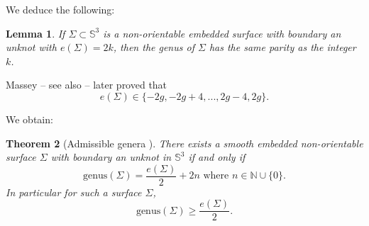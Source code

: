 \documentclass[10pt,a4paper]{amsart}
\newtheorem{thm}{Theorem}[section]
\newtheorem{lemma}[thm]{Lemma}
\numberwithin{equation}{section}
\begin{document}
We deduce the following:

\begin{lemma}\label{parity}
If $\Sigma\subset \mathbb{S}^3$ is a non-orientable embedded surface with boundary an unknot with $e(\Sigma)=2k$, then the genus of $\Sigma$ has the same parity as the integer $k$.
\end{lemma}

Massey \cite{Ma} -- see also \cite[Corollary 1.1.1]{Yasuhara} -- later proved that 
\begin{equation}\label{options}
e(\Sigma)\in \{-2g,-2g+4,..., 2g-4, 2g\}.
\end{equation}

We obtain: 

\begin{thm}[Admissible genera \cite{Whitney,Ma}]\label{admissible}
There exists a smooth embedded non-orientable surface $\Sigma$ with boundary an unknot in $\mathbb{S}^3$ if and only if
\begin{equation}\label{adgen}
\mbox{genus}(\Sigma)=\frac{e(\Sigma)}{2}+2n\mbox{ where } n\in\mathbb{N}\cup\{0\}.
\end{equation}
In particular for such a surface $\Sigma$,
\begin{equation}
\mbox{genus}(\Sigma)\geq\frac{e(\Sigma)}{2}.
\end{equation}
\end{thm}
\end{document}
